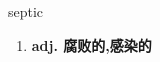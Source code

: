 
\begin{frame}
{\huge septic}
\begin{center}
\begin{enumerate}\Large
  \item \textbf{adj. 腐败的,感染的}
\end{enumerate}
\end{center}
\end{frame}
